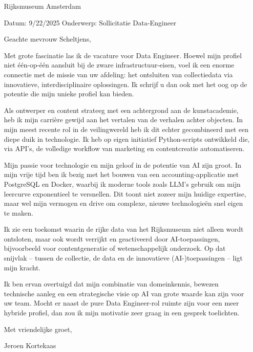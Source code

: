 Rijksmuseum Amsterdam

Datum: 9/22/2025 Onderwerp: Sollicitatie Data-Engineer

Geachte mevrouw Scheltjens,

Met grote fascinatie las ik de vacature voor Data Engineer. Hoewel mijn
profiel niet één-op-één aansluit bij de zware infrastructuur-eisen, voel
ik een enorme connectie met de missie van uw afdeling: het ontsluiten
van collectiedata via innovatieve, interdisciplinaire oplossingen. Ik
schrijf u dan ook met het oog op de potentie die mijn unieke profiel kan
bieden.

Als ontwerper en content strateeg met een achtergrond aan de
kunstacademie, heb ik mijn carrière gewijd aan het vertalen van de
verhalen achter objecten. In mijn meest recente rol in de veilingwereld
heb ik dit echter gecombineerd met een diepe duik in technologie. Ik heb
op eigen initiatief Python-scripts ontwikkeld die, via API's, de
volledige workflow van marketing en contentcreatie automatiseren.

Mijn passie voor technologie en mijn geloof in de potentie van AI zijn
groot. In mijn vrije tijd ben ik bezig met het bouwen van een
accounting-applicatie met PostgreSQL en Docker, waarbij ik moderne tools
zoals LLM's gebruik om mijn leercurve exponentieel te versnellen. Dit
toont niet zozeer mijn huidige expertise, maar wel mijn vermogen en
drive om complexe, nieuwe technologieën snel eigen te maken.

Ik zie een toekomst waarin de rijke data van het Rijksmuseum niet alleen
wordt ontsloten, maar ook wordt verrijkt en geactiveerd door
AI-toepassingen, bijvoorbeeld voor contentgeneratie of wetenschappelijk
onderzoek. Op dat snijvlak -- tussen de collectie, de data en de
innovatieve (AI-)toepassingen -- ligt mijn kracht.

Ik ben ervan overtuigd dat mijn combinatie van domeinkennis, bewezen
technische aanleg en een strategische visie op AI van grote waarde kan
zijn voor uw team. Mocht er naast de pure Data Engineer-rol ruimte zijn
voor een meer hybride profiel, dan zou ik mijn motivatie zeer graag in
een gesprek toelichten.

Met vriendelijke groet,

Jeroen Kortekaas
